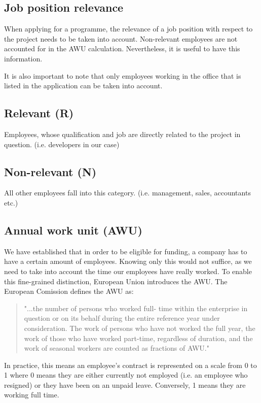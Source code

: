 \documentclass[12pt,oneside]{fithesis2}
\begin{document}
    \subsection{Job position relevance}
    When applying for a programme, the relevance of a job position with respect to the project needs to be taken into account. Non-relevant employees are not accounted for in the AWU calculation. Nevertheless, it is useful to have this information.
    
    It is also important to note that only employees working in the office that is listed in the application can be taken into account.\cite[page~30]{czech-rules}
    \subsection*{Relevant (R)}
    Employees, whose qualification and job are directly related to the project in question. (i.e. developers in our case)\cite[page~30]{czech-rules}
    \subsection*{Non-relevant (N)}
    All other employees fall into this category. (i.e. management, sales, accountants etc.)\cite[page~30]{czech-rules}
    \subsection{Annual work unit (AWU)}
    We have established that in order to be eligible for funding, a company has to have a certain amount of employees. Knowing only this would not suffice, as we need to take into account the time our employees have really worked. To enable this fine-grained distinction, European Union introduces the AWU.
    \newline\newline
    The European Comission defines the AWU as:
    \blockquote{"...the number of persons who worked full- time within the enterprise in question or on its behalf during the entire reference year under consideration. The work of persons who have not worked the full year, the work of those who have worked part-time, regardless of duration, and the work of seasonal workers are counted as fractions of AWU."\cite[page~71]{eu-commision-regulation}}
    In practice, this means an employee's contract is represented on a scale from 0 to 1 where 0 means they are either currently not employed (i.e. an employee who resigned) or they have been on an unpaid leave. Conversely, 1 means they are working full time.
    
\end{document}
